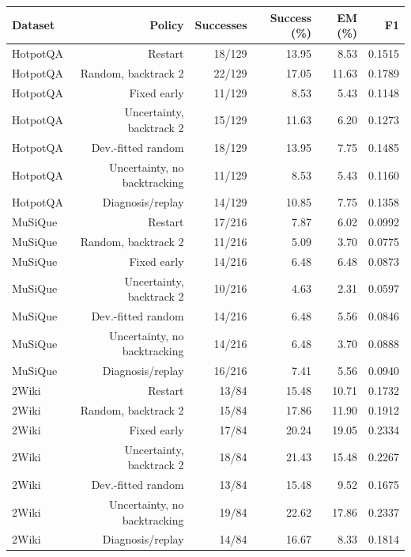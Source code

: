 \begin{tabular}{@{}lrrrrr@{}}
\toprule
Dataset & Policy & Successes & Success (\%) & EM (\%) & F1 \\
\midrule
HotpotQA & Restart & 18/129 & 13.95 & 8.53 & 0.1515 \\
HotpotQA & Random, backtrack 2 & 22/129 & 17.05 & 11.63 & 0.1789 \\
HotpotQA & Fixed early & 11/129 & 8.53 & 5.43 & 0.1148 \\
HotpotQA & Uncertainty, backtrack 2 & 15/129 & 11.63 & 6.20 & 0.1273 \\
HotpotQA & Dev.-fitted random & 18/129 & 13.95 & 7.75 & 0.1485 \\
HotpotQA & Uncertainty, no backtracking & 11/129 & 8.53 & 5.43 & 0.1160 \\
HotpotQA & Diagnosis/replay & 14/129 & 10.85 & 7.75 & 0.1358 \\
MuSiQue & Restart & 17/216 & 7.87 & 6.02 & 0.0992 \\
MuSiQue & Random, backtrack 2 & 11/216 & 5.09 & 3.70 & 0.0775 \\
MuSiQue & Fixed early & 14/216 & 6.48 & 6.48 & 0.0873 \\
MuSiQue & Uncertainty, backtrack 2 & 10/216 & 4.63 & 2.31 & 0.0597 \\
MuSiQue & Dev.-fitted random & 14/216 & 6.48 & 5.56 & 0.0846 \\
MuSiQue & Uncertainty, no backtracking & 14/216 & 6.48 & 3.70 & 0.0888 \\
MuSiQue & Diagnosis/replay & 16/216 & 7.41 & 5.56 & 0.0940 \\
2Wiki & Restart & 13/84 & 15.48 & 10.71 & 0.1732 \\
2Wiki & Random, backtrack 2 & 15/84 & 17.86 & 11.90 & 0.1912 \\
2Wiki & Fixed early & 17/84 & 20.24 & 19.05 & 0.2334 \\
2Wiki & Uncertainty, backtrack 2 & 18/84 & 21.43 & 15.48 & 0.2267 \\
2Wiki & Dev.-fitted random & 13/84 & 15.48 & 9.52 & 0.1675 \\
2Wiki & Uncertainty, no backtracking & 19/84 & 22.62 & 17.86 & 0.2337 \\
2Wiki & Diagnosis/replay & 14/84 & 16.67 & 8.33 & 0.1814 \\
\bottomrule
\end{tabular}
